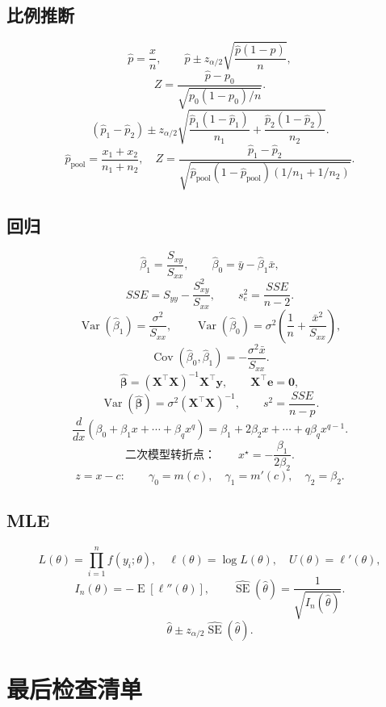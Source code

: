 \documentclass[11pt,a4paper]{article}
\newcommand{\E}{\operatorname{E}}
\newcommand{\Var}{\operatorname{Var}}
\newcommand{\Cov}{\operatorname{Cov}}
\newcommand{\SE}{\operatorname{SE}}
\newcommand{\1}{\mathbf{1}}
\newcommand{\by}{\mathbf{y}}
\newcommand{\bX}{\mathbf{X}}
\newcommand{\be}{\mathbf{e}}
\newcommand{\bbeta}{\boldsymbol{\beta}}
\begin{document}
\subsection{比例推断}

\[
  \hat p=\frac xn,
  \qquad
  \hat p\pm z_{\alpha/2}
  \sqrt{\frac{\hat p(1-\hat p)}n},
\]
\[
  Z=\frac{\hat p-p_0}{\sqrt{p_0(1-p_0)/n}}.
\]
\[
  (\hat p_1-\hat p_2)
  \pm
  z_{\alpha/2}
  \sqrt{
  \frac{\hat p_1(1-\hat p_1)}{n_1}
  +
  \frac{\hat p_2(1-\hat p_2)}{n_2}
  }.
\]
\[
  \hat p_{\mathrm{pool}}=\frac{x_1+x_2}{n_1+n_2},
\quad
  Z=
  \frac{\hat p_1-\hat p_2}
  {\sqrt{\hat p_{\mathrm{pool}}(1-\hat p_{\mathrm{pool}})
  (1/n_1+1/n_2)}}.
\]

\subsection{回归}

\[
  \hat\beta_1=\frac{S_{xy}}{S_{xx}},
  \qquad
  \hat\beta_0=\bar y-\hat\beta_1\bar x,
\]
\[
  SSE=S_{yy}-\frac{S_{xy}^2}{S_{xx}},
  \qquad
  s_e^2=\frac{SSE}{n-2}.
\]
\[
  \Var(\hat\beta_1)=\frac{\sigma^2}{S_{xx}},
  \qquad
  \Var(\hat\beta_0)
  =
  \sigma^2\left(\frac1n+\frac{\bar x^2}{S_{xx}}\right),
\]
\[
  \Cov(\hat\beta_0,\hat\beta_1)
  =
  -\frac{\sigma^2\bar x}{S_{xx}}.
\]
\[
  \hat{\bbeta}=(\bX^\top\bX)^{-1}\bX^\top\by,
  \qquad
  \bX^\top\be=\mathbf0,
\]
\[
  \Var(\hat{\bbeta})
  =
  \sigma^2(\bX^\top\bX)^{-1},
  \qquad
  s^2=\frac{SSE}{n-p}.
\]
\[
  \frac{d}{dx}
  \left(\beta_0+\beta_1x+\cdots+\beta_qx^q\right)
  =
  \beta_1+2\beta_2x+\cdots+q\beta_qx^{q-1}.
\]
\[
  \text{二次模型转折点：}\qquad
  x^\star=-\frac{\beta_1}{2\beta_2}.
\]
\[
  z=x-c:\qquad
  \gamma_0=m(c),\quad
  \gamma_1=m'(c),\quad
  \gamma_2=\beta_2.
\]

\subsection{MLE}

\[
  L(\theta)=\prod_{i=1}^nf(y_i;\theta),
  \quad
  \ell(\theta)=\log L(\theta),
  \quad
  U(\theta)=\ell'(\theta),
\]
\[
  I_n(\theta)=-\E[\ell''(\theta)],
  \qquad
  \widehat{\SE}(\hat\theta)
  =
  \frac1{\sqrt{I_n(\hat\theta)}}.
\]
\[
  \hat\theta
  \pm
  z_{\alpha/2}\widehat{\SE}(\hat\theta).
\]

\section{最后检查清单}
\end{document}
